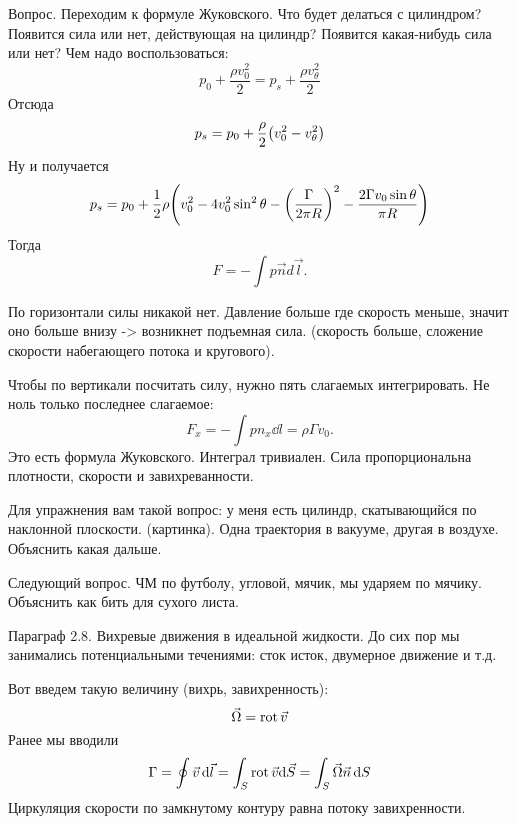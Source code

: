 Вопрос. Переходим к формуле Жуковского. Что будет делаться с цилиндром? Появится сила или нет, действующая на цилиндр? Появится какая-нибудь сила или нет? Чем надо воспользоваться:
\begin{equation}
	p_0+\frac{\rho v_0^2}{2}=p_s+\frac{\rho v_\theta^2}{2}
\end{equation}
Отсюда
\begin{equation}
	p_s=p_0+\frac{\rho}{2}\qty(v_0^2-v_\theta^2)
\end{equation}
Ну и получается
\begin{equation}
	p_s=p_0+\frac12\rho\qty(v_0^2-4v_0^2\sin^2\theta-\qty(\frac{\Gamma}{2\pi R})^2-\frac{2\Gamma v_0\sin\theta}{\pi R})
\end{equation}
Тогда
\begin{equation}
	F=-\int p\vec{n}d\vec{l}.
\end{equation}

По горизонтали силы никакой нет. Давление больше где скорость меньше, значит оно больше внизу -> возникнет подъемная сила. (скорость больше, сложение скорости набегающего потока и кругового).

Чтобы по вертикали посчитать силу, нужно пять слагаемых интегрировать. Не ноль только последнее слагаемое:
\begin{equation}
	F_x=-\int p n_x \dd{l}=\rho \Gamma v_0. 
\end{equation}
Это есть формула Жуковского. Интеграл тривиален. Сила пропорциональна плотности, скорости и завихреванности.

Для упражнения вам такой вопрос: у меня есть цилиндр, скатывающийся по наклонной плоскости. (картинка). Одна траектория в вакууме, другая в воздухе. Объяснить какая дальше.

Следующий вопрос. ЧМ по футболу, угловой, мячик, мы ударяем по мячику. Объяснить как бить для сухого листа.

 
Параграф 2.8. Вихревые движения в идеальной жидкости. До сих пор мы занимались потенциальными течениями: сток исток, двумерное движение и т.д.

Вот введем такую величину (вихрь, завихренность):
\begin{equation}
	\vec\Omega=\operatorname{rot} \vec{v}
\end{equation}
Ранее мы вводили 
\begin{equation}
	\Gamma=\oint \vec{v} \,\dd\vec{l}
	=\int_S \operatorname{rot} \vec{v}\dd \vec{S}=\int_S \vec\Omega\vec{n}\,\dd S 
\end{equation}
Циркуляция скорости по замкнутому контуру равна потоку завихренности.

